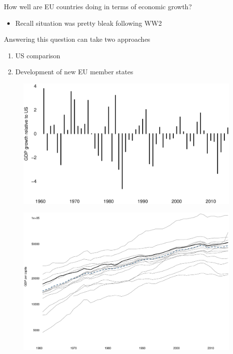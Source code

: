 \documentclass{beamer}
\begin{document}
\begin{frame}
  How well are EU countries doing in terms of economic growth?
  \begin{itemize}
    \item Recall situation was pretty bleak following WW2
  \end{itemize}
  \medskip
  Answering this question can take two approaches  
\begin{enumerate}
  \item US comparison
  \item Development of new EU member states
\end{enumerate}
\end{frame}

\begin{frame}
  \begin{figure}
    \includegraphics[scale=.3]{versus_us.eps}
  \end{figure}
\end{frame}

\begin{frame}
  \begin{figure}
    \includegraphics[scale=.3]{versus_us2.eps}
  \end{figure}
\end{frame}
\end{document}
